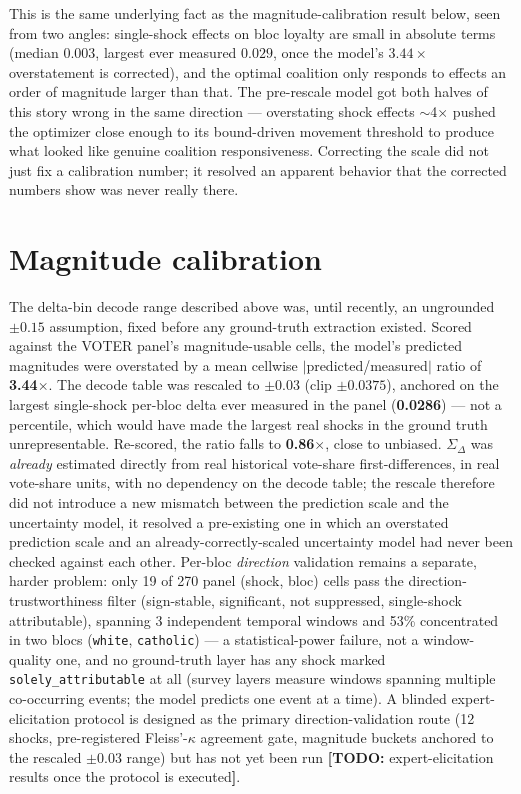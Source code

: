 \documentclass[11pt]{article}
\newcommand{\todo}[1]{{\color{red}\textbf{[TODO:} #1\textbf{]}}}
\begin{document}
This is the same underlying fact as the magnitude-calibration result below,
seen from two angles: single-shock effects on bloc loyalty are small in
absolute terms (median $0.003$, largest ever measured $0.029$, once the
model's $3.44\times$ overstatement is corrected), and the optimal coalition
only responds to effects an order of magnitude larger than that. The
pre-rescale model got both halves of this story wrong in the same
direction --- overstating shock effects $\sim$4$\times$ pushed the optimizer
close enough to its bound-driven movement threshold to produce what looked
like genuine coalition responsiveness. Correcting the scale did not just fix
a calibration number; it resolved an apparent behavior that the corrected
numbers show was never really there.

\section*{Magnitude calibration}
The delta-bin decode range described above was, until recently, an
ungrounded $\pm0.15$ assumption, fixed before any ground-truth extraction
existed. Scored against the VOTER panel's magnitude-usable cells, the
model's predicted magnitudes were overstated by a mean cellwise
$|$predicted/measured$|$ ratio of \textbf{3.44$\times$}. The decode table was
rescaled to $\pm0.03$ (clip $\pm0.0375$), anchored on the largest
single-shock per-bloc delta ever measured in the panel (\textbf{0.0286}) ---
not a percentile, which would have made the largest real shocks in the
ground truth unrepresentable. Re-scored, the ratio falls to
\textbf{0.86$\times$}, close to unbiased. $\Sigma_\Delta$ was \emph{already}
estimated directly from real historical vote-share first-differences, in
real vote-share units, with no dependency on the decode table; the rescale
therefore did not introduce a new mismatch between the prediction scale and
the uncertainty model, it resolved a pre-existing one in which an overstated
prediction scale and an already-correctly-scaled uncertainty model had never
been checked against each other. Per-bloc \emph{direction} validation
remains a separate, harder problem: only 19 of 270 panel (shock, bloc) cells
pass the direction-trustworthiness filter (sign-stable, significant, not
suppressed, single-shock attributable), spanning 3 independent temporal
windows and 53\% concentrated in two blocs (\texttt{white},
\texttt{catholic}) --- a statistical-power failure, not a window-quality
one, and no ground-truth layer has any shock marked
\texttt{solely\_attributable} at all (survey layers measure windows spanning
multiple co-occurring events; the model predicts one event at a time). A
blinded expert-elicitation protocol is designed as the primary
direction-validation route (12 shocks, pre-registered Fleiss'-$\kappa$
agreement gate, magnitude buckets anchored to the rescaled $\pm0.03$ range)
but has not yet been run \todo{expert-elicitation results once the protocol
is executed}.
\end{document}
